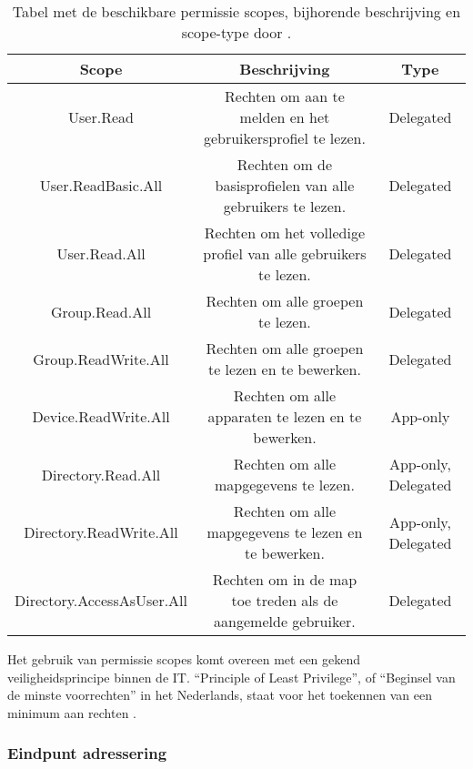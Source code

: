 \begin{table}[ht]
    \centering
    \begin{adjustbox}{width=1\textwidth}
    \begin{tabular}{ |c|c|c| }
        \hline
        \textbf{Scope} & \textbf{Beschrijving} & \textbf{Type} \\
        \hline
        User.Read & Rechten om aan te melden en het gebruikersprofiel te lezen. & Delegated \\
        User.ReadBasic.All & Rechten om de basisprofielen van alle gebruikers te lezen. & Delegated \\
        User.Read.All & Rechten om het volledige profiel van alle gebruikers te lezen. & Delegated \\
        Group.Read.All & Rechten om alle groepen te lezen. & Delegated \\
        Group.ReadWrite.All & Rechten om alle groepen te lezen en te bewerken. & Delegated \\
        Device.ReadWrite.All & Rechten om alle apparaten te lezen en te bewerken. & App-only \\
        Directory.Read.All & Rechten om alle mapgegevens te lezen. & App-only, Delegated \\
        Directory.ReadWrite.All & Rechten om alle mapgegevens te lezen en te bewerken. & App-only, Delegated \\
        Directory.AccessAsUser.All & Rechten om in de map toe treden als de aangemelde gebruiker. & Delegated \\
        \hline
    \end{tabular}
    \end{adjustbox}
    \caption[Tabel Azure AD Graph Permission scopes]{Tabel met de beschikbare permissie scopes, bijhorende beschrijving en scope-type door \textcite{Microsoft2016a}.}
    \label{psaad}
\end{table}

Het gebruik van permissie scopes komt overeen met een gekend veiligheidsprincipe binnen de \ac{IT}. “Principle of Least Privilege”, of “Beginsel van de minste voorrechten” in het Nederlands, staat voor het toekennen van een minimum aan rechten \autocite{Saltzer1975}. 



\subsubsection{Eindpunt adressering}

